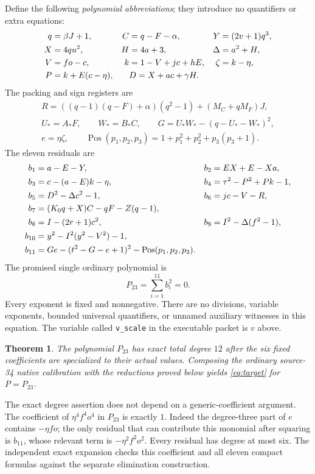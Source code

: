 \documentclass[11pt]{article}
\newtheorem{theorem}{Theorem}[section]
\newcommand{\Pos}{\operatorname{Pos}}
\begin{document}
Define the following \emph{polynomial abbreviations}; they introduce no
quantifiers or extra equations:
\begin{align}
 q&=\beta J+1,& C&=q-F-\alpha,& Y&=(2v+1)q^3,\notag\\
 X&=4qu^2,& H&=4a+3,& \Delta&=a^2+H,\notag\\
 V&=fo-c,& k&=1-V+jc+hE,& \zeta&=k-\eta,\notag\\
 P&=k+E(c-\eta),&&D=X+ac+\gamma H.\label{eq:23-abbrev}
\end{align}
The packing and sign registers are
\begin{gather*}
 R=((q-1)(q-F)+\alpha)(q^2-1)+(M_C+qM_F)J,\\
 U_*=A_*F,\qquad W_*=B_*C,\qquad
 G=U_*W_*-(q-U_*-W_*)^2,\\
 e=\eta\zeta,\qquad
 \Pos(p_1,p_2,p_3)=1+p_1^2+p_2^2+p_3(p_3+1).
\end{gather*}
The eleven residuals are
\begin{align}
 b_1&=a-E-Y, &
 b_2&=EX+E-Xa,\notag\\
 b_3&=c-(a-E)k-\eta,&
 b_4&=\tau^2-P^2+Pk-1,\notag\\
 b_5&=D^2-\Delta c^2-1,&
 b_6&=jc-V-R,\notag\\
 b_7&=(K_0q+X)C-qF-Z(q-1),&&\notag\\
 b_8&=I-(2r+1)c^2,&
 b_9&=I^2-\Delta(f^2-1),\label{eq:23-residuals}\\
 b_{10}&=y^2-I^2(y^2-V^2)-1,&&\notag\\
 b_{11}&=Ge-(t^2-G-e+1)^2-\Pos(p_1,p_2,p_3).&&\notag
\end{align}
The promised single ordinary polynomial is
\begin{equation}\boxed{\quad P_{23}=\sum_{i=1}^{11}b_i^2=0.\quad}\label{eq:P23}\end{equation}
Every exponent is fixed and nonnegative. There are no divisions, variable
exponents, bounded universal quantifiers, or unnamed auxiliary witnesses in
this equation. The variable called \texttt{v\_scale} in the executable packet
is $v$ above.

\begin{theorem}\label{thm:23}
The polynomial $P_{23}$ has exact total degree $12$ after the six fixed
coefficients are specialized to their actual values. Composing the ordinary
source-34 native calibration with the reductions proved below yields
\eqref{eq:target} for $P=P_{23}$.
\end{theorem}
The exact degree assertion does not depend on a generic-coefficient
argument. The coefficient of $\eta^4 f^4o^4$ in $P_{23}$ is exactly $1$.
Indeed the degree-three part of $e$ contains $-\eta fo$; the only residual
that can contribute this monomial after squaring is $b_{11}$, whose relevant
term is $-\eta^2f^2o^2$. Every residual has degree at most six.
The independent exact expansion checks this coefficient and all eleven
compact formulas against the separate elimination construction.
\end{document}
